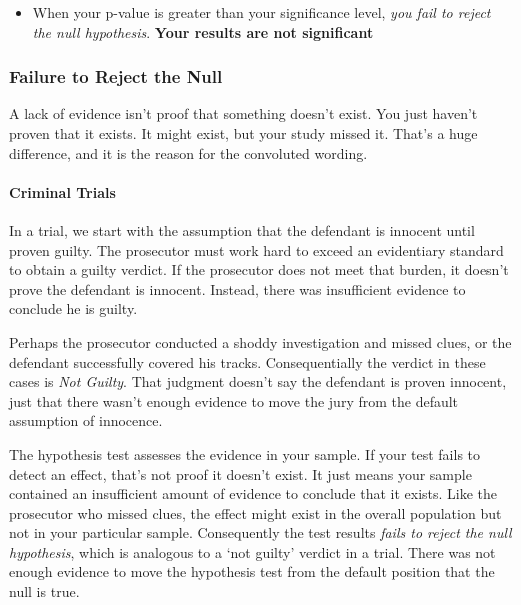 \documentclass[11pt]{article}
\providecommand{\tightlist}{%
      \setlength{\itemsep}{0pt}\setlength{\parskip}{0pt}}
\begin{document}
\begin{itemize}
\tightlist
\item
  When your p-value is greater than your significance level, \emph{you
  fail to reject the null hypothesis}. \textbf{Your results are not
  significant}
\end{itemize}

\hypertarget{failure-to-reject-the-null}{%
\subsubsection{Failure to Reject the
Null}\label{failure-to-reject-the-null}}

A lack of evidence isn't proof that something doesn't exist. You just
haven't proven that it exists. It might exist, but your study missed it.
That's a huge difference, and it is the reason for the convoluted
wording.

\hypertarget{criminal-trials}{%
\paragraph{Criminal Trials}\label{criminal-trials}}

In a trial, we start with the assumption that the defendant is innocent
until proven guilty. The prosecutor must work hard to exceed an
evidentiary standard to obtain a guilty verdict. If the prosecutor does
not meet that burden, it doesn't prove the defendant is innocent.
Instead, there was insufficient evidence to conclude he is guilty.

Perhaps the prosecutor conducted a shoddy investigation and missed
clues, or the defendant successfully covered his tracks. Consequentially
the verdict in these cases is \emph{Not Guilty}. That judgment doesn't
say the defendant is proven innocent, just that there wasn't enough
evidence to move the jury from the default assumption of innocence.

The hypothesis test assesses the evidence in your sample. If your test
fails to detect an effect, that's not proof it doesn't exist. It just
means your sample contained an insufficient amount of evidence to
conclude that it exists. Like the prosecutor who missed clues, the
effect might exist in the overall population but not in your particular
sample. Consequently the test results \emph{fails to reject the null
hypothesis}, which is analogous to a `not guilty' verdict in a trial.
There was not enough evidence to move the hypothesis test from the
default position that the null is true.
\end{document}
